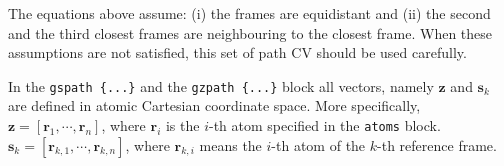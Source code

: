 The equations above assume: (i) the frames are equidistant and (ii) the second and the third closest frames are neighbouring to the closest frame. When these assumptions are not satisfied, this set of path CV should be used carefully.


In the \texttt{gspath~\{...\}} and the \texttt{gzpath~\{...\}} block all vectors, namely $\mathbf{z}$ and $\mathbf{s}_{k}$ are defined in atomic Cartesian coordinate space. More specifically, $\mathbf{z} = \left[\mathbf{r}_{1}, \cdots, \mathbf{r}_{n}\right]$, where $\mathbf{r}_{i}$ is the $i$-th atom specified in the \texttt{atoms} block. $\mathbf{s}_{k} = \left[\mathbf{r}_{k,1}, \cdots, \mathbf{r}_{k,n}\right]$, where $\mathbf{r}_{k,i}$ means the $i$-th atom of the $k$-th reference frame.

